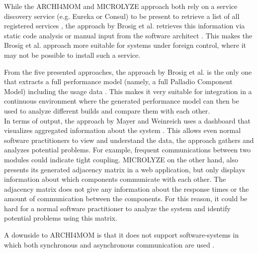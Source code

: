 While the ARCHI4MOM and MICROLYZE approach both rely on a service discovery service (e.g. Eureka or Consul) to be present to retrieve a list of all registered services \cite{Singh2022ARCHI4MOM,Kleehaus2018}, the approach by Brosig et al. retrieves this information via static code analysis or manual input from the software architect \cite{Brosig2011}.
This makes the Brosig et al. approach more suitable for systems under foreign control, where it may not be possible to install such a service.

From the five presented approaches, the approach by Brosig et al. is the only one that extracts a full performance model (namely, a full Palladio Component Model) including the usage data \cite{Brosig2011}.
This makes it very suitable for integration in a continuous environment where the generated performance model can then be used to analyze different builds and compare them with each other.
\\

In terms of output, the approach by Mayer and Weinreich uses a dashboard that visualizes aggregated information about the system \cite{Mayer2018}.
This allows even normal software practitioners to view and understand the data, the approach gathers and analyzes potential problems.
For example, frequent communications between two modules could indicate tight coupling.
MICROLYZE on the other hand, also presents its generated adjacency matrix in a web application, but only displays information about which components communicate with each other.
The adjacency matrix does not give any information about the response times or the amount of communication between the components.
For this reason, it could be hard for a normal software practitioner to analyze the system and identify potential problems using this matrix.







A downside to ARCHI4MOM is that it does not support software-systems in which both synchronous and asynchronous communication are used \cite{Singh2022ARCHI4MOM}.




